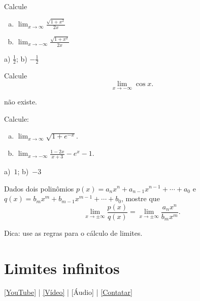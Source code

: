 \begin{exer}
  Calcule
  \begin{enumerate}[a)]
  \item $\displaystyle\lim_{x\to \infty} \frac{\sqrt{1+x^2}}{2x}$
  \item $\displaystyle\lim_{x\to -\infty} \frac{\sqrt{1+x^2}}{2x}$
\end{enumerate}
\end{exer}
\begin{resp}
  a) $\frac{1}{2}$; b) $-\frac{1}{2}$
\end{resp}

\begin{exer}
  Calcule
  \begin{equation}
    \lim_{x\to -\infty} \cos x.
  \end{equation}
\end{exer}
\begin{resp}
  não existe.
\end{resp}

\begin{exer}
  Calcule:
  \begin{enumerate}[a)]
  \item $\displaystyle\lim_{x\to \infty} \sqrt{1+e^{-x}}$.
  \item $\displaystyle\lim_{x\to -\infty} \frac{1-2x}{x+3} -e^{x} - 1$.
  \end{enumerate}
\end{exer}
\begin{resp}
  a)~$1$; b)~$-3$
\end{resp}

\begin{exer}\label{exer:lim_xinf_racio}
  Dados dois polinômios $p(x) = a_nx^n+a_{n-1}x^{n-1}+\cdots + a_0$ e $q(x) = b_mx^m+b_{m-1}x^{m-1}+\cdots + b_0$, mostre que
  \begin{equation}
    \lim_{x\to \pm\infty} \frac{p(x)}{q(x)} = \lim_{x\to\pm\infty}\frac{a_nx^n}{b_mx^m}.
  \end{equation}
\end{exer}
\begin{resp}
  Dica: use as regras para o cálculo de limites.
\end{resp}


\section{Limites infinitos}\label{cap_lim_sec_lim_inf}

\begin{flushright}
  \href{https://youtu.be/KsWI1qgzr88}{[YouTube]} | \href{https://archive.org/details/video_20220723_2330}{[Vídeo]} | [Áudio] | \href{https://phkonzen.github.io/notas/contato.html}{[Contatar]}
\end{flushright}

